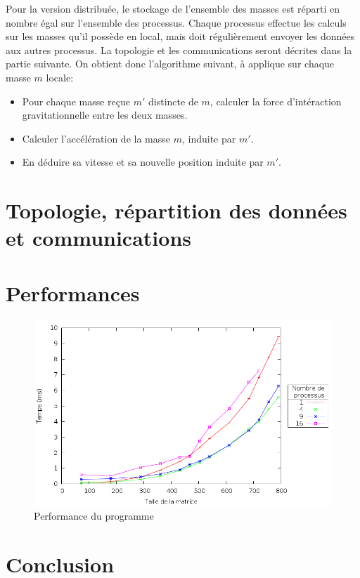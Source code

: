 \documentclass[a4paper,11pt]{article}
\begin{document}
Pour la version distribuée, le stockage de l'ensemble des masses est réparti en nombre égal sur l'ensemble des processus. Chaque processus effectue les calculs sur les masses qu'il possède en local, mais doit régulièrement envoyer les données aux autres processus. La topologie et les communications seront décrites dans la partie suivante. On obtient donc l'algorithme suivant, à applique sur chaque masse $m$ locale:\\
\begin{itemize}
\item Pour chaque masse  reçue $m'$ distincte de $m$, calculer la force d'intéraction gravitationnelle entre les deux masses.
\item Calculer l'accélération de la masse $m$, induite par $m'$.
\item En déduire sa vitesse et sa nouvelle position induite par $m'$.
\end{itemize}

\section{Topologie, répartition des données et communications}
 
\section{Performances}

\begin{figure}[h!]
  \centering
  \includegraphics[width=\textwidth]{plot.png}
  \caption{Performance du programme}
  \label{perf}
\end{figure}


\section{Conclusion}
\end{document}
